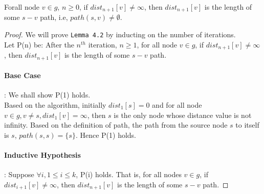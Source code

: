 \begin{sublemma} \label{lemma4.2}
Forall node $v \in g$, $n \geq 0$, if $dist_{n+1}[v] \neq \infty$, then $dist_{n+1}[v]$ is the length of some $s-v$ path, i.e, $path(s, v) \neq \emptyset$.  
\end{sublemma}
\begin{proof}
We will prove \texttt{Lemma 4.2} by inducting on the number of iterations. 
\\
Let P(n) be: After the $n^{th}$ iteration, $n \geq 1$, for all node $v \in g$, if $dist_{n+1}[v] \neq \infty$, then $dist_{n+1}[v]$ is the length of some $s-v$ path. 

\paragraph*{Base Case}: We shall show P(1) holds. 
\\
Based on the algorithm, initially $dist_1[s] = 0$ and for all node $v \in g, v \neq s, dist_1[v] = \infty$, then $s$ is the only node whose distance value is not infinity. Based on the definition of path, the path from the source node $s$ to itself is $s$, $path(s, s) = \{s\}$. Hence P(1) holds. 
\paragraph*{Inductive Hypothesis}: Suppose $\forall i, 1 \leq i \leq k$, P(i) holds. That is, for all nodes $v \in g$, if $dist_{i+1}[v] \neq \infty$, then $dist_{n+1}[v]$ is the length of some $s-v$ path. 


\end{proof}
